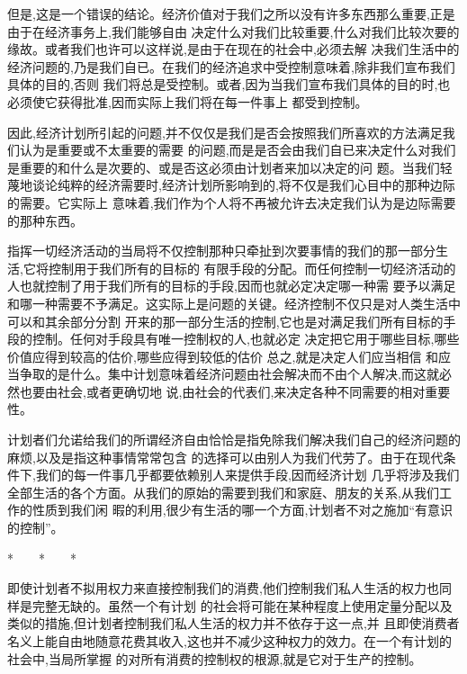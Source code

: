 ﻿\documentclass[12pt]{article}
\begin{document}
但是,这是一个错误的结论。经济价值对于我们之所以没有许多东西那么重要,正是由于在经济事务上,我们能够自由
决定什么对我们比较重要,什么对我们比较次要的缘故。或者我们也许可以这样说,是由于在现在的社会中,必须去解
决我们生活中的经济问题的,乃是我们自已。在我们的经济追求中受控制意味着,除非我们宣布我们具体的目的,否则
我们将总是受控制。或者,因为当我们宣布我们具体的目的时,也必须使它获得批准,因而实际上我们将在每一件事上
都受到控制。

因此,经济计划所引起的问题,并不仅仅是我们是否会按照我们所喜欢的方法满足我们认为是重要或不太重要的需要
的问题,而是是否会由我们自已来决定什么对我们是重要的和什么是次要的、或是否这必须由计划者来加以决定的问
题。当我们轻蔑地谈论纯粹的经济需要时,经济计划所影响到的,将不仅是我们心目中的那种边际的需要。它实际上
意味着,我们作为个人将不再被允许去决定我们认为是边际需要的那种东西。

指挥一切经济活动的当局将不仅控制那种只牵扯到次要事情的我们的那一部分生活,它将控制用于我们所有的目标的
有限手段的分配。而任何控制一切经济活动的人也就控制了用于我们所有的目标的手段,因而也就必定决定哪一种需
要予以满足和哪一种需要不予满足。这实际上是问题的关键。经济控制不仅只是对人类生活中可以和其余部分分割
开来的那一部分生活的控制,它也是对满足我们所有目标的手段的控制。任何对手段具有唯一控制权的人,也就必定
决定把它用于哪些目标,哪些价值应得到较高的估价,哪些应得到较低的估价 \myrule 总之,就是决定人们应当相信
和应当争取的是什么。集中计划意味着经济问题由社会解决而不由个人解决,而这就必然也要由社会,或者更确切地
说,由社会的代表们,来决定各种不同需要的相对重要性。

计划者们允诺给我们的所谓经济自由恰恰是指免除我们解决我们自己的经济问题的麻烦,以及是指这种事情常常包含
的选择可以由别人为我们代劳了。由于在现代条件下,我们的每一件事几乎都要依赖别人来提供手段,因而经济计划
几乎将涉及我们全部生活的各个方面。从我们的原始的需要到我们和家庭、朋友的关系,从我们工作的性质到我们闲
暇的利用,很少有生活的哪一个方面,计划者不对之施加``有意识的控制''。

*　　*　　*

即使计划者不拟用权力来直接控制我们的消费,他们控制我们私人生活的权力也同样是完整无缺的。虽然一个有计划
的社会将可能在某种程度上使用定量分配以及类似的措施,但计划者控制我们私人生活的权力并不依存于这一点,并
且即使消费者名义上能自由地随意花费其收入,这也并不减少这种权力的效力。在一个有计划的社会中,当局所掌握
的对所有消费的控制权的根源,就是它对于生产的控制。
\end{document}

